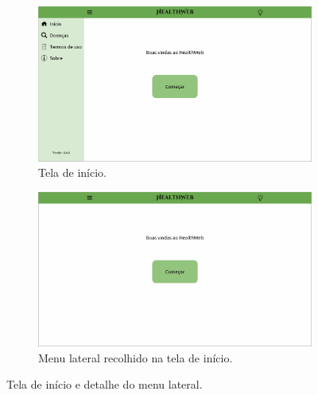 \begin{figure}[htbp]
	\centering
	\begin{subfigure}{0.49\linewidth}
		\centering
		\includegraphics[width=\linewidth]{figure/prototype/desktop/home.png}
		\caption{Tela de início.}
		\label{fig:desktop:home}
	\end{subfigure}
	\hfill
	\begin{subfigure}{0.49\linewidth}
		\centering
		\includegraphics[width=\linewidth]{figure/prototype/desktop/drawer.png}
		\caption{Menu lateral recolhido na tela de início.}
		\label{fig:desktop:drawer}
	\end{subfigure}
	\caption{Tela de início e detalhe do menu lateral.}
	\label{fig:desktop:home_agreeing}
\end{figure}

